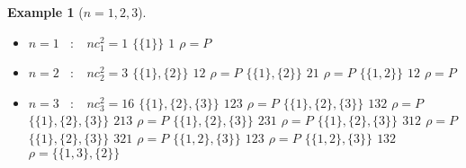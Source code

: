 \documentclass[12pt]{report}
\newtheorem*{example}{Example}
\begin{document}
\begin{example}[$n = 1, 2, 3$]
    ~\\
    \begin{itemize}
            \item $n = 1$ \  $:$ \  $nc^2_1 = 1$
            \subitem $\{\{1\}\}$ \hspace{1cm} $1$
                \hspace{1cm} $\rho = P$
            \item $n = 2$ \  $:$ \  $nc^2_2 = 3$
            \subitem $\{\{1\}, \{2\}\}$ \hspace{1cm} $12$
                \hspace{1cm} $\rho = P$
            \subitem $\{\{1\}, \{2\}\}$ \hspace{1cm} $21$
                \hspace{1cm} $\rho = P$
            \subitem $\{\{1, 2\}\}$ \hspace{14mm} $12$
                \hspace{1cm} $\rho = P$
            \item $n = 3$ \  $:$ \  $nc^2_3 = 16$
            \subitem $\{\{1\}, \{2\}, \{3\}\}$ \hspace{1cm}
                $123$ \hspace{1cm} $\rho = P$
            \subitem $\{\{1\}, \{2\}, \{3\}\}$ \hspace{1cm}
                $132$ \hspace{1cm} $\rho = P$
            \subitem $\{\{1\}, \{2\}, \{3\}\}$ \hspace{1cm}
                $213$ \hspace{1cm} $\rho = P$
            \subitem $\{\{1\}, \{2\}, \{3\}\}$ \hspace{1cm}
                $231$ \hspace{1cm} $\rho = P$
            \subitem $\{\{1\}, \{2\}, \{3\}\}$ \hspace{1cm}
                $312$ \hspace{1cm} $\rho = P$
            \subitem $\{\{1\}, \{2\}, \{3\}\}$ \hspace{1cm}
                $321$ \hspace{1cm} $\rho = P$       
            \subitem $\{\{1, 2\}, \{3\}\}$ \hspace{14mm}
                $123$ \hspace{1cm} $\rho = P$
            \subitem $\{\{1, 2\}, \{3\}\}$ \hspace{14mm}
                $132$ \hspace{1cm} $\rho = \{\{1, 3\}, \{2\}\}$

\end{itemize}
\end{example}
\end{document}
